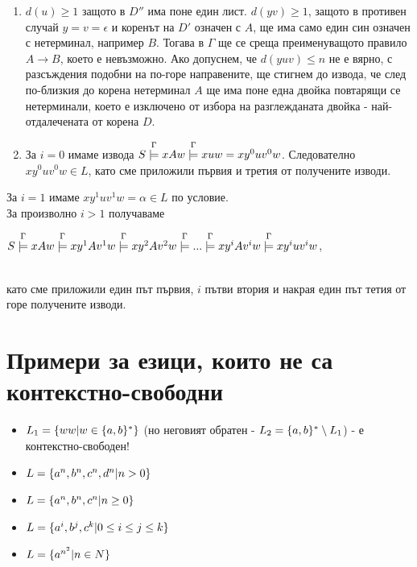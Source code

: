 \documentclass[11pt]{article}
\begin{document}
\enumNum
\begin{enumerate}
	\item $d(u) \geq 1$ защото в $D''$ има поне един лист. $d(yv) \geq 1$, защото в противен случай $y = v = \epsilon$ и коренът на $D'$ означен с $A$, ще има само един син означен с нетерминал, например $B$. Тогава в $\Gamma$ ще се среща преименуващото правило $A \to B$, което е невъзможно. Ако допуснем, че $d(yuv) \leq n$ не е вярно, с разсъждения подобни на по-горе направените, ще стигнем до извода, че след по-близкия до корена нетерминал $A$ ще има поне една двойка повтарящи се нетерминали, което е изключено от избора на разглежданата двойка - най-отдалечената от корена $D$. \par
	\item За $i = 0$ имаме извода $S \overset{\Gamma}{\models} xAw \overset{\Gamma}{\models} xuw = xy^{0}uv^{0}w$. Следователно $xy^{0}uv^{0}w \in L$, като сме приложили първия и третия от получените изводи. \par
\end{enumerate}
За $i = 1$ имаме $xy^{1}uv^{1}w = \alpha \in L$ по условие.\\
За произволно $i > 1$ получаваме \\
\centerline{$S \overset{\Gamma}{\models} xAw \overset{\Gamma}{\models} xy^{1}Av^{1}w \overset{\Gamma}{\models} xy^{2}Av^{2}w \overset{\Gamma}{\models} ... \overset{\Gamma}{\models} xy^{i}Av^{i}w \overset{\Gamma}{\models} xy^{i}uv^{i}w$,} \\

като сме приложили един път първия, $i$ пътви втория и накрая един път тетия от горе получените изводи. 


\section{Примери за езици, които не са контекстно-свободни}
\begin{itemize}
	\item $L_{1} = \{ww|w \in \{a, b\}^{*}\}$ (но неговият обратен - $L_{2} = \{a,b\}^{*} \setminus L_{1}$) - е контекстно-свободен!
	\item $L = \{a^{n}, b^{n}, c^{n}, d^{n} | n > 0\}$
	\item $L = \{a^{n}, b^{n}, c^{n} | n \geq 0\}$
    \item $L = \{a^{i}, b^{j}, c^{k} |  0 \leq i \leq j \leq k\}$
    \item $L = \{a^{n^{2}} |  n \in N\}$
\end{itemize}
\end{document}
